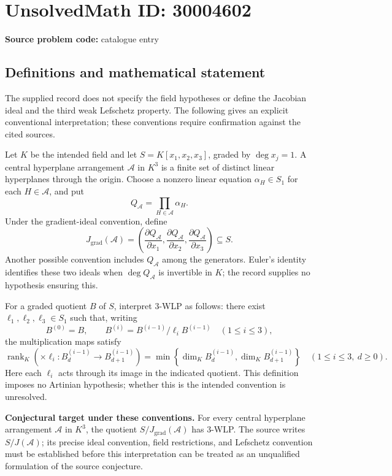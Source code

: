 \documentclass[11pt]{article}
\begin{document}
\section*{UnsolvedMath ID: 30004602}
\textbf{Source problem code:} catalogue entry
\subsection{Definitions and mathematical statement}
The supplied record does not specify the field hypotheses or define the Jacobian ideal and the third weak Lefschetz property. The following gives an explicit conventional interpretation; these conventions require confirmation against the cited sources.

Let \(K\) be the intended field and let \(S=K[x_1,x_2,x_3]\), graded by \(\deg x_j=1\). A central hyperplane arrangement \(\mathcal A\) in \(K^3\) is a finite set of distinct linear hyperplanes through the origin. Choose a nonzero linear equation \(\alpha_H\in S_1\) for each \(H\in\mathcal A\), and put
\[
Q_{\mathcal A}=\prod_{H\in\mathcal A}\alpha_H.
\]
Under the gradient-ideal convention, define
\[
J_{\mathrm{grad}}(\mathcal A)=\left(\frac{\partial Q_{\mathcal A}}{\partial x_1},\frac{\partial Q_{\mathcal A}}{\partial x_2},\frac{\partial Q_{\mathcal A}}{\partial x_3}\right)\subseteq S.
\]
Another possible convention includes \(Q_{\mathcal A}\) among the generators. Euler's identity identifies these two ideals when \(\deg Q_{\mathcal A}\) is invertible in \(K\); the record supplies no hypothesis ensuring this.

For a graded quotient \(B\) of \(S\), interpret \(3\)-WLP as follows: there exist \(\ell_1,\ell_2,\ell_3\in S_1\) such that, writing
\[
B^{(0)}=B,\qquad B^{(i)}=B^{(i-1)}/\ell_iB^{(i-1)}\quad(1\leq i\leq3),
\]
the multiplication maps satisfy
\[
\operatorname{rank}_K\!\left(\times\ell_i:B^{(i-1)}_d\longrightarrow B^{(i-1)}_{d+1}\right)
=\min\!\left\{\dim_K B^{(i-1)}_d,\dim_K B^{(i-1)}_{d+1}\right\}
\quad(1\leq i\leq3,\ d\geq0).
\]
Here each \(\ell_i\) acts through its image in the indicated quotient. This definition imposes no Artinian hypothesis; whether this is the intended convention is unresolved.

\textbf{Conjectural target under these conventions.} For every central hyperplane arrangement \(\mathcal A\) in \(K^3\), the quotient \(S/J_{\mathrm{grad}}(\mathcal A)\) has \(3\)-WLP. The source writes \(S/J(\mathcal A)\); its precise ideal convention, field restrictions, and Lefschetz convention must be established before this interpretation can be treated as an unqualified formulation of the source conjecture.
\end{document}
